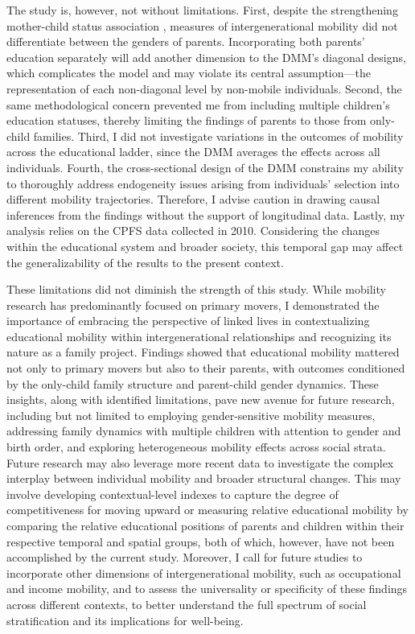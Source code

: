 The study is, however, not without limitations. First, despite the strengthening mother-child status association \parencite{huGenderEducationExpansion2023}, measures of intergenerational mobility did not differentiate between the genders of parents. Incorporating both parents' education separately will add another dimension to the DMM's diagonal designs, which complicates the model and may violate its central assumption—the representation of each non-diagonal level by non-mobile individuals. Second, the same methodological concern prevented me from including multiple children's education statuses, thereby limiting the findings of parents to those from only-child families. Third, I did not investigate variations in the outcomes of mobility across the educational ladder, since the DMM averages the effects across all individuals. Fourth, the cross-sectional design of the DMM constrains my ability to thoroughly address endogeneity issues arising from individuals' selection into different mobility trajectories. Therefore, I advise caution in drawing causal inferences from the findings without the support of longitudinal data. Lastly, my analysis relies on the CPFS data collected in 2010. Considering the changes within the educational system and broader society, this temporal gap may affect the generalizability of the results to the present context.

These limitations did not diminish the strength of this study. While mobility research has predominantly focused on primary movers, I demonstrated the importance of embracing the perspective of linked lives in contextualizing educational mobility within intergenerational relationships and recognizing its nature as a family project. Findings showed that educational mobility mattered not only to primary movers but also to their parents, with outcomes conditioned by the only-child family structure and parent-child gender dynamics. These insights, along with identified limitations, pave new avenue for future research, including but not limited to employing gender-sensitive mobility measures, addressing family dynamics with multiple children with attention to gender and birth order, and exploring heterogeneous mobility effects across social strata. Future research may also leverage more recent data to investigate the complex interplay between individual mobility and broader structural changes. This may involve developing contextual-level indexes to capture the degree of competitiveness for moving upward or measuring relative educational mobility by comparing the relative educational positions of parents and children within their respective temporal and spatial groups, both of which, however, have not been accomplished by the current study. Moreover, I call for future studies to incorporate other dimensions of intergenerational mobility, such as occupational and income mobility, and to assess the universality or specificity of these findings across different contexts, to better understand the full spectrum of social stratification and its implications for well-being.
